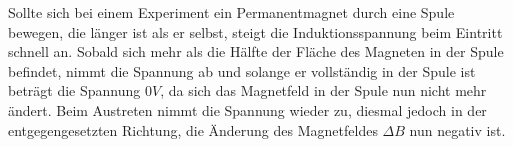 Sollte sich bei einem Experiment ein Permanentmagnet durch eine Spule bewegen, die länger ist als er selbst, steigt die Induktionsspannung beim Eintritt schnell an. Sobald sich mehr als die Hälfte der Fläche des Magneten in der Spule befindet, nimmt die Spannung ab und solange er vollständig in der Spule ist beträgt die Spannung $0V$, da sich das Magnetfeld in der Spule nun nicht mehr ändert. Beim Austreten nimmt die Spannung wieder zu, diesmal jedoch in der entgegengesetzten Richtung, die Änderung des Magnetfeldes $\Delta B$ nun negativ ist.